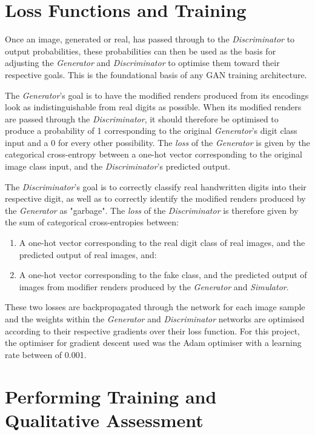 \documentclass[a4paper,11pt,openany]{book}
\begin{document}
\section*{Loss Functions and Training}
\label{sec:org717b5d3}

Once an image, generated or real, has passed through to the \emph{Discriminator} to output probabilities, these probabilities can then be used as the basis for adjusting the \emph{Generator} and \emph{Discriminator} to optimise them toward their respective goals.
This is the foundational basis of any GAN training architecture.

The \emph{Generator}'s goal is to have the modified renders produced from its encodings look as indistinguishable from real digits as possible.
When its modified renders are passed through the \emph{Discriminator}, it should therefore be optimised to produce a probability of 1 corresponding to the original \emph{Generator}'s digit class input and a 0 for every other possibility.
The \emph{loss} of the \emph{Generator} is given by the categorical cross-entropy between a one-hot vector corresponding to the original image class input, and the \emph{Discriminator}'s predicted output.

The \emph{Discriminator}'s goal is to correctly classify real handwritten digits into their respective digit, as well as to correctly identify the modified renders produced by the \emph{Generator} as "garbage".
The \emph{loss} of the \emph{Discriminator} is therefore given by the sum of categorical cross-entropies between:
\begin{enumerate}
\item A one-hot vector corresponding to the real digit class of real images, and the predicted output of real images, and:
\item A one-hot vector corresponding to the fake class, and the predicted output of images from modifier renders produced by the \emph{Generator} and \emph{Simulator}.
\end{enumerate}

These two losses are backpropagated through the network for each image sample and the weights within the \emph{Generator} and \emph{Discriminator} networks are optimised according to their respective gradients over their loss function.
For this project, the optimiser for gradient descent used was the Adam optimiser \cite{1412.6980} with a learning rate between of 0.001.

\section*{Performing Training and Qualitative Assessment}
\label{sec:orgdf5280d}
\end{document}
